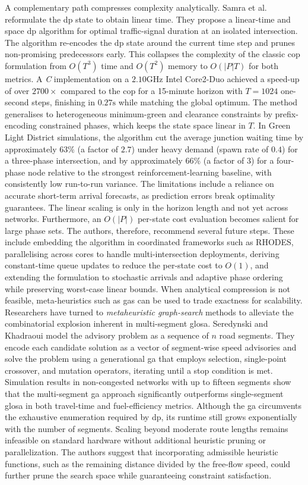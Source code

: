 A complementary path compresses complexity analytically. Samra et al. \cite{Samra2015} reformulate the \ac{dp} state to obtain linear time. They propose a linear-time and space \ac{dp} algorithm for optimal traffic-signal duration at an isolated intersection. The algorithm re-encodes the \ac{dp} state around the current time step and prunes non-promising predecessors early. This collapses the complexity of the classic \ac{cop} formulation from $O(T^{3})$ time and $O(T^{2})$ memory to $O(|P|T)$ for both metrics. A \textit{C} implementation on a $2.10\unit{\giga\hertz}$ Intel Core2-Duo achieved a speed-up of over $2700\times$ compared to the \ac{cop} for a 15-minute horizon with $T=1024$ one-second steps, finishing in $0.27\unit{\second}$ while matching the global optimum. The method generalises to heterogeneous minimum-green and clearance constraints by prefix-encoding constrained phases, which keeps the state space linear in $T$. In Green Light District simulations, the algorithm cut the average junction waiting time by approximately $63\%$ (a factor of $2.7$) under heavy demand (spawn rate of $0.4$) for a three-phase intersection, and by approximately $66\%$ (a factor of $3$) for a four-phase node relative to the strongest reinforcement-learning baseline, with consistently low run-to-run variance.
The limitations include a reliance on accurate short-term arrival forecasts, as prediction errors break optimality guarantees. The linear scaling is only in the horizon length and not yet across networks. Furthermore, an $O(|P|)$ per-state cost evaluation becomes salient for large phase sets. The authors, therefore, recommend several future steps. These include embedding the algorithm in coordinated frameworks such as RHODES, parallelising across cores to handle multi-intersection deployments, deriving constant-time queue updates to reduce the per-state cost to $O(1)$, and extending the formulation to stochastic arrivals and adaptive phase ordering while preserving worst-case linear bounds.
\mynewline
When analytical compression is not feasible, meta-heuristics such as \acp{ga} can be used to trade exactness for scalability. Researchers have turned to \emph{metaheuristic graph-search} methods to alleviate the combinatorial explosion inherent in multi-segment \ac{glosa}. Seredynski and Khadraoui \cite{Seredynski2013} model the advisory problem as a sequence of $n$ road segments. They encode each candidate solution as a vector of segment-wise speed advisories and solve the problem using a generational \ac{ga} that employs selection, single-point crossover, and mutation operators, iterating until a stop condition is met. Simulation results in non-congested networks with up to fifteen segments show that the multi-segment \ac{ga} approach significantly outperforms single-segment \ac{glosa} in both travel-time and fuel-efficiency metrics. Although the \ac{ga} circumvents the exhaustive enumeration required by \ac{dp}, its runtime still grows exponentially with the number of segments. Scaling beyond moderate route lengths remains infeasible on standard hardware without additional heuristic pruning or parallelization. The authors suggest that incorporating admissible heuristic functions, such as the remaining distance divided by the free-flow speed, could further prune the search space while guaranteeing constraint satisfaction.
